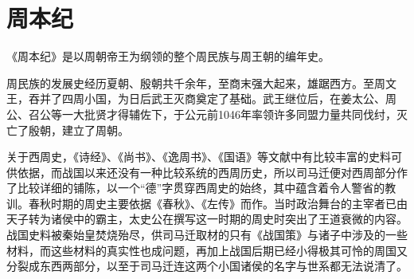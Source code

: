 \documentclass[12pt,UTF8]{ctexbook}
\begin{document}
\chapter{周本纪}

《周本纪》是以周朝帝王为纲领的整个周民族与周王朝的编年史。

周民族的发展史经历夏朝、殷朝共千余年，至商末强大起来，雄踞西方。至周文王，吞并了四周小国，为日后武王灭商奠定了基础。武王继位后，在姜太公、周公、召公等一大批贤才得辅佐下，于公元前1046年率领许多同盟力量共同伐纣，灭亡了殷朝，建立了周朝。

关于西周史，《诗经》、《尚书》、《逸周书》、《国语》等文献中有比较丰富的史料可供依据，而战国以来还没有一种比较系统的西周历史，所以司马迁便对西周部分作了比较详细的铺陈，以一个“德”字贯穿西周史的始终，其中蕴含着令人警省的教训。春秋时期的周史主要依据《春秋》、《左传》而作。当时政治舞台的主宰者已由天子转为诸侯中的霸主，太史公在撰写这一时期的周史时突出了王道衰微的内容。战国史料被秦始皇焚烧殆尽，供司马迁取材的只有《战国策》与诸子中涉及的一些材料，而这些材料的真实性也成问题，再加上战国后期已经小得极其可怜的周国又分裂成东西两部分，以至于司马迁连这两个小国诸侯的名字与世系都无法说清了。
\end{document}
